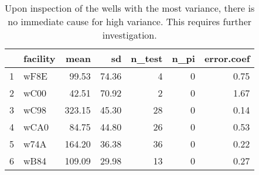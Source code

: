 \begin{table}[h]
\centering
\begin{tabular}{rlrrrrr}
  \hline
 & facility & mean & sd & n\_test & n\_pi & error.coef \\ 
  \hline
1 & wF8E & 99.53 & 74.36 &   4 &   0 & 0.75 \\ 
  2 & wC00 & 42.51 & 70.92 &   2 &   0 & 1.67 \\ 
  3 & wC98 & 323.15 & 45.30 &  28 &   0 & 0.14 \\ 
  4 & wCA0 & 84.75 & 44.80 &  26 &   0 & 0.53 \\ 
  5 & w74A & 164.20 & 36.38 &  36 &   0 & 0.22 \\ 
  6 & wB84 & 109.09 & 29.98 &  13 &   0 & 0.27 \\ 
   \hline
\end{tabular}
\caption{Upon inspection of the wells with the most variance, there is no immediate cause for high variance. This requires further investigation.} 
\label{tab:well_summaries}
\end{table}
